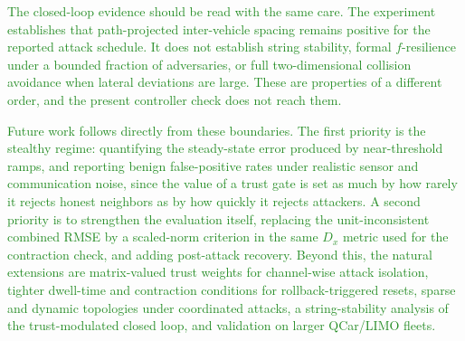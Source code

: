 \documentclass[letterpaper,journal]{IEEEtran}
\newcommand{\azrevcolor}{ForestGreen}
\newcommand{\azrev}[1]{\textcolor{\azrevcolor}{#1}}
\begin{document}
\azrev{The closed-loop evidence should be read with the same care. The experiment establishes that path-projected inter-vehicle spacing remains positive for the reported attack schedule. It does not establish string stability, formal $f$-resilience under a bounded fraction of adversaries, or full two-dimensional collision avoidance when lateral deviations are large. These are properties of a different order, and the present controller check does not reach them.}

\azrev{Future work follows directly from these boundaries. The first priority is the stealthy regime: quantifying the steady-state error produced by near-threshold ramps, and reporting benign false-positive rates under realistic sensor and communication noise, since the value of a trust gate is set as much by how rarely it rejects honest neighbors as by how quickly it rejects attackers. A second priority is to strengthen the evaluation itself, replacing the unit-inconsistent combined RMSE by a scaled-norm criterion in the same $D_x$ metric used for the contraction check, and adding post-attack recovery. Beyond this, the natural extensions are matrix-valued trust weights for channel-wise attack isolation, tighter dwell-time and contraction conditions for rollback-triggered resets, sparse and dynamic topologies under coordinated attacks, a string-stability analysis of the trust-modulated closed loop, and validation on larger QCar/LIMO fleets.}




\end{document}
